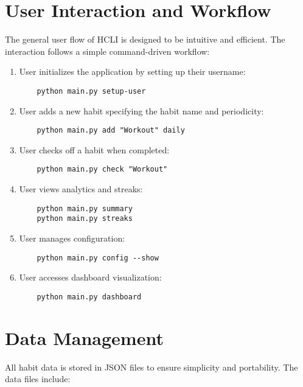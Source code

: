 \documentclass[a4paper,12pt]{article}
\begin{document}
\section{User Interaction and Workflow}
The general user flow of HCLI is designed to be intuitive and efficient. The interaction follows a simple command-driven workflow:

\begin{enumerate}
    \item User initializes the application by setting up their username:
    \begin{verbatim}
    python main.py setup-user
    \end{verbatim}
    
    \item User adds a new habit specifying the habit name and periodicity:
    \begin{verbatim}
    python main.py add "Workout" daily
    \end{verbatim}
    
    \item User checks off a habit when completed:
    \begin{verbatim}
    python main.py check "Workout"
    \end{verbatim}

    \item User views analytics and streaks:
    \begin{verbatim}
    python main.py summary
    python main.py streaks
    \end{verbatim}

    \item User manages configuration:
    \begin{verbatim}
    python main.py config --show
    \end{verbatim}

    \item User accesses dashboard visualization:
    \begin{verbatim}
    python main.py dashboard
    \end{verbatim}
\end{enumerate}

\section{Data Management}
All habit data is stored in JSON files to ensure simplicity and portability. The data files include:
\end{document}
